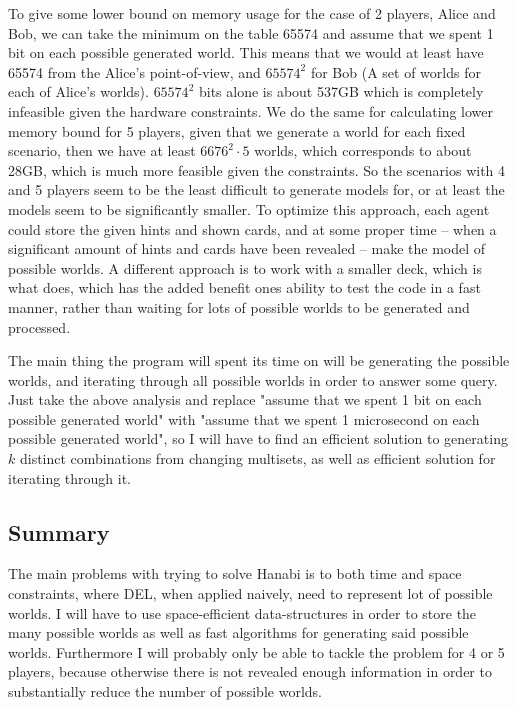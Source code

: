 To give some lower bound on memory usage for the case of 2 players, Alice and Bob, we can take the minimum on the table 65574 and assume that we spent 1 bit on each possible generated world. 
This means that we would at least have 65574 from the Alice's point-of-view, and $65574^2$ for Bob (A set of worlds for each of Alice's worlds). 
$65574^2$ bits alone is about 537GB which is completely infeasible given the hardware constraints. 
We do the same for calculating lower memory bound for 5 players, given that we generate a world for each fixed scenario, then we have at least $6676^2 \cdot 5$ worlds, which corresponds to about 28GB, which is much more feasible given the constraints.
So the scenarios with 4 and 5 players seem to be the least difficult to generate models for, or at least the models seem to be significantly smaller.
To optimize this approach, each agent could store the given hints and shown cards, and at some proper time -- when a significant amount of hints and cards have been revealed -- make the model of possible worlds. 
A different approach is to work with a smaller deck, which is what \cite{EgerAndMartens17} does, which has the added benefit ones ability to test the code in a fast manner, rather than waiting for lots of possible worlds to be generated and processed.

The main thing the program will spent its time on will be generating the possible worlds, and iterating through all possible worlds in order to answer some query. 
Just take the above analysis and replace "assume that we spent 1 bit on each possible generated world" with "assume that we spent 1 microsecond on each possible generated world", so I will have to find an efficient solution to generating $k$ distinct combinations from changing multisets, as well as efficient solution for iterating through it.

\subsection{Summary}
The main problems with trying to solve Hanabi is to both time and space constraints, where DEL, when applied naively, need to represent lot of possible worlds. 
I will have to use space-efficient data-structures in order to store the many possible worlds as well as fast algorithms for generating said possible worlds. 
Furthermore I will probably only be able to tackle the problem for 4 or 5 players, because otherwise there is not revealed enough information in order to substantially reduce the number of possible worlds.
